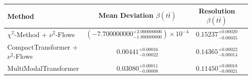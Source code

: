     \begin{tabular}{lccc}
        \toprule
        Method & Mean Deviation $\beta(t\bar{t})$ & Resolution $\beta(t\bar{t})$ \\
        \midrule
        $\chi^2$-Method + $\nu^2$-Flows & $(-7.700000000^{+2.000000000}_{-1.800000000})\times 10^{-4}$ & $0.15237^{+0.00020}_{-0.00035}$ \\
        CompactTransformer + $\nu^2$-Flows & $0.00441^{+0.00016}_{-0.00022}$ & $0.14365^{+0.00022}_{-0.00014}$ \\
        MultiModalTransformer & $0.03080^{+0.00011}_{-0.00008}$ & $0.11450^{+0.00018}_{-0.00021}$ \\
        \bottomrule
    \end{tabular}